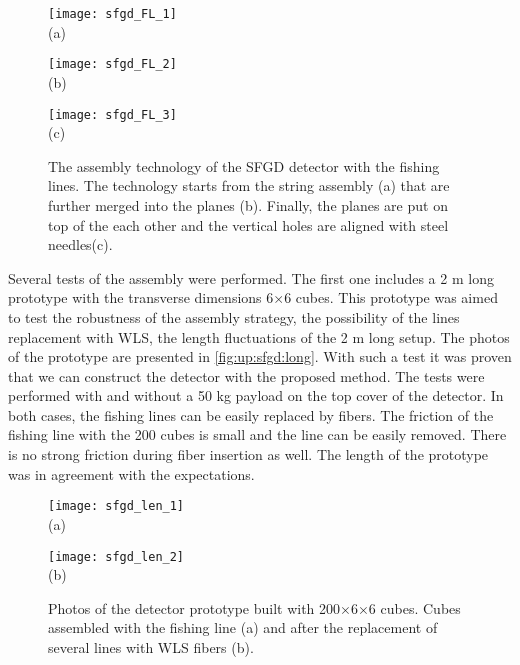 \documentclass[main.tex]{subfiles}
\begin{document}
\begin{figure}[!ht]
	\centering
  \begin{minipage}{0.33\linewidth}
    \centering
    \texttt{[image: sfgd\_FL\_1]} \\ (a)
  \end{minipage}
  \begin{minipage}{0.33\linewidth}
    \centering
    \texttt{[image: sfgd\_FL\_2]} \\ (b)
  \end{minipage}
  \begin{minipage}{0.33\linewidth}
    \centering
    \texttt{[image: sfgd\_FL\_3]} \\ (c)
  \end{minipage}
  \caption{The assembly technology of the SFGD detector with the fishing lines. The technology starts from the string assembly (a) that are further merged into the planes (b). Finally, the planes are put on top of the each other and the vertical holes are aligned with steel needles(c).}
  \label{fig:up:sfgd:string}
\end{figure}

Several tests of the assembly were performed. The first one includes a 2 m long prototype with the transverse dimensions 6$\times$6 cubes. This prototype was aimed to test the robustness of the assembly strategy, the possibility of the lines replacement with WLS, the length fluctuations of the 2 m long setup. The photos of the prototype are presented in \autoref{fig:up:sfgd:long}. With such a test it was proven that we can construct the detector with the proposed method. The tests were performed with and without a 50 kg payload on the top cover of the detector. In both cases, the fishing lines can be easily replaced by fibers. The friction of the fishing line with the 200 cubes is small and the line can be easily removed. There is no strong friction during fiber insertion as well. The length of the prototype was in agreement with the expectations.

\begin{figure}[!ht]
	\centering
  \begin{minipage}{0.49\linewidth}
    \centering
    \texttt{[image: sfgd\_len\_1]} \\ (a)
  \end{minipage}
  \begin{minipage}{0.49\linewidth}
    \centering
    \texttt{[image: sfgd\_len\_2]} \\ (b)
  \end{minipage}
  \caption{Photos of the detector prototype built with 200$\times$6$\times$6 cubes. Cubes assembled with the fishing line (a) and after the replacement of several lines with WLS fibers (b).}
  \label{fig:up:sfgd:long}
\end{figure}
\end{document}
